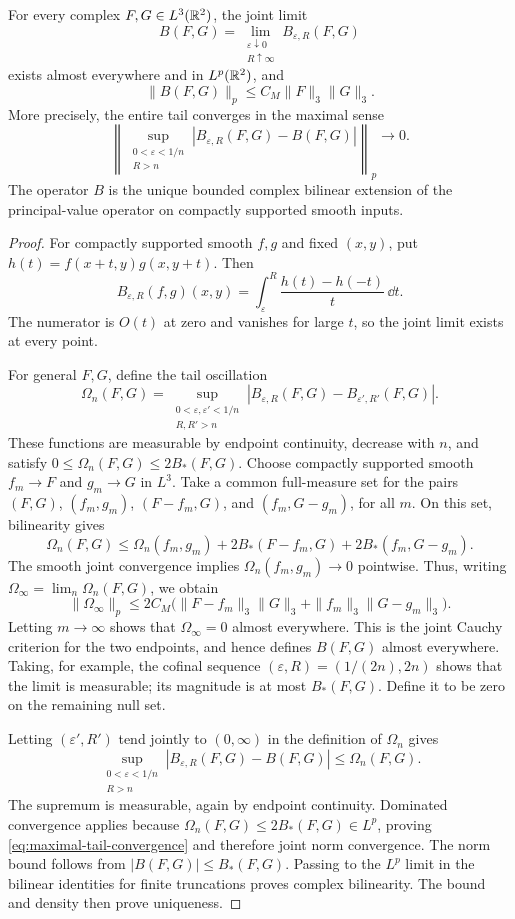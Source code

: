 \begin{corollary}\label{cor:bilinear-pv}
For every complex $F,G\in L^3(\mathbb R^2)$, the joint limit
\[
 B(F,G)=\lim_{\substack{\varepsilon\downarrow0\\R\uparrow\infty}}
 B_{\varepsilon,R}(F,G)
\]
exists almost everywhere and in $L^p(\mathbb R^2)$, and
\[
 \|B(F,G)\|_p\le C_M\|F\|_3\|G\|_3.
\]
More precisely, the entire tail converges in the maximal sense
\begin{equation}\label{eq:maximal-tail-convergence}
 \left\|\sup_{\substack{0<\varepsilon<1/n\\R>n}}
 |B_{\varepsilon,R}(F,G)-B(F,G)|\right\|_p
 \longrightarrow0.
\end{equation}
The operator $B$ is the unique bounded complex bilinear extension of
the principal-value operator on compactly supported smooth inputs.
\end{corollary}

\begin{proof}
For compactly supported smooth $f,g$ and fixed $(x,y)$, put
$h(t)=f(x+t,y)g(x,y+t)$. Then
\[
 B_{\varepsilon,R}(f,g)(x,y)
 =\int_\varepsilon^R\frac{h(t)-h(-t)}t\,\dd t.
\]
The numerator is $O(t)$ at zero and vanishes for large $t$, so the joint
limit exists at every point.

For general $F,G$, define the tail oscillation
\[
 \Omega_n(F,G)=
 \sup_{\substack{0<\varepsilon,\varepsilon'<1/n\\R,R'>n}}
 |B_{\varepsilon,R}(F,G)-B_{\varepsilon',R'}(F,G)|.
\]
These functions are measurable by endpoint continuity, decrease with
$n$, and satisfy $0\le\Omega_n(F,G)\le2B_*(F,G)$. Choose compactly
supported smooth $f_m\to F$ and $g_m\to G$ in $L^3$. Take a common
full-measure set for the pairs $(F,G)$, $(f_m,g_m)$, $(F-f_m,G)$,
and $(f_m,G-g_m)$, for all $m$. On this set, bilinearity gives
\[
 \Omega_n(F,G)\le\Omega_n(f_m,g_m)
       +2B_*(F-f_m,G)+2B_*(f_m,G-g_m).
\]
The smooth joint convergence implies $\Omega_n(f_m,g_m)\to0$ pointwise.
Thus, writing $\Omega_\infty=\lim_n\Omega_n(F,G)$, we obtain
\[
 \|\Omega_\infty\|_p
 \le2C_M\bigl(\|F-f_m\|_3\|G\|_3
             +\|f_m\|_3\|G-g_m\|_3\bigr).
\]
Letting $m\to\infty$ shows that $\Omega_\infty=0$ almost everywhere.
This is the joint Cauchy criterion for the two endpoints, and hence
defines $B(F,G)$ almost everywhere. Taking, for example, the cofinal
sequence $(\varepsilon,R)=(1/(2n),2n)$ shows that the limit is measurable;
its magnitude is at most $B_*(F,G)$. Define it to be zero on the
remaining null set.

Letting $(\varepsilon',R')$ tend jointly to $(0,\infty)$ in the
definition of $\Omega_n$ gives
\[
 \sup_{\substack{0<\varepsilon<1/n\\R>n}}
 |B_{\varepsilon,R}(F,G)-B(F,G)|\le\Omega_n(F,G).
\]
The supremum is measurable, again by endpoint continuity.
Dominated convergence applies because
$\Omega_n(F,G)\le2B_*(F,G)\in L^p$, proving
\eqref{eq:maximal-tail-convergence} and therefore joint norm convergence.
The norm bound follows from $|B(F,G)|\le B_*(F,G)$. Passing to the
$L^p$ limit in the bilinear identities for finite truncations proves
complex bilinearity. The bound and density then prove uniqueness.
\end{proof}

